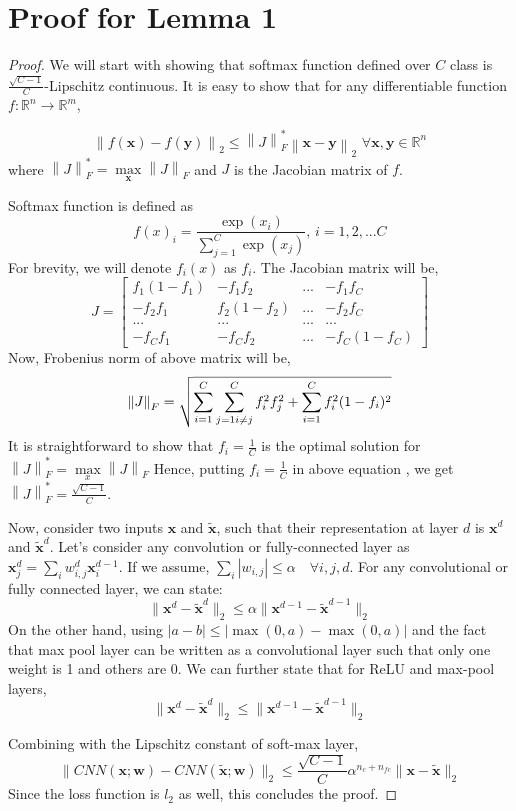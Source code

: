 
\section{Proof for Lemma 1}
\begin{proof}
We will start with showing that softmax function defined over $C$ class is $\frac{\sqrt{C-1}}{C}$-Lipschitz continuous. It is easy to show that for any differentiable function \mbox{$f:\mathbb{R}^n\rightarrow\mathbb{R}^m$},

\[
\left \| f(\mathbf{x})-f(\mathbf{y})\right \|_2 \leq \left \|J\right \|^*_F  \left\| \mathbf{x}-\mathbf{y}\right\|_2  \, \, \forall \mathbf{x},\mathbf{y}\in\mathbb{R}^n
\]
where $\left \|J\right \|^*_F = \max\limits_{\mathbf{x}} \left \|J\right \|_F$ and $J$ is the Jacobian matrix of $f$.

Softmax function is defined as
\[
f(x)_i = \frac{\exp(x_i)}{\sum\limits_{j=1}^{C}\exp(x_j)}, \, i={1,2,...C}
\]
For brevity, we will denote $f_i(x)$ as $f_i$. The Jacobian matrix will be,
\[
J = \begin{bmatrix} f_1(1-f_1) & -f_1f_2  & ... & -f_1f_C \\
-f_2f_1 & f_2(1-f_2)  & ...  & -f_2f_C \\
... & ... & ... & ...  \\
-f_{C}f_{1} & -f_{C}f_{2}  & ...  & -f_{C}(1-f_{C})
\end{bmatrix}
\]
Now, Frobenius norm of above matrix will be,
\[
\left \| J \right \|_F = \sqrt{\sum\limits_{i=1}^{C}\sum\limits_{j=1 \\ i\neq j}^{C}f_{i}^{2}f_{j}^{2} + \sum\limits_{i=1}^{C} f_i^2(1-f_i)^2}
\]
It is straightforward to show that $f_i = \frac{1}{C}$ is the optimal solution for $\left \| J \right \|^{*}_F = \max\limits_{x}\left \| J \right \|_F $ Hence, putting $f_i = \frac{1}{C}$ in above equation , we get \mbox{$\left \| J \right \|^{*}_F = \frac{\sqrt{C-1}}{C}$}.

Now, consider two inputs $\mathbf{x}$ and $\mathbf{\tilde{x}}$, such that their representation at layer $d$ is $\mathbf{x}^d$ and $\mathbf{\tilde{x}}^d$. Let's consider any convolution or fully-connected layer as $\mathbf{x}^d_j = \sum_i w_{i,j}^d \mathbf{x}^{d-1}_i$. If we assume, \mbox{$\sum_i |w_{i,j}| \leq \alpha \quad \forall i,j,d$}.  For any convolutional or fully connected layer, we can state:
\[
\|\mathbf{x}^d - \mathbf{\tilde{x}}^d\|_2 \leq  \alpha \|\mathbf{x}^{d-1} - \mathbf{\tilde{x}}^{d-1}\|_2
\] 
On the other hand, using $|a-b| \leq |\max(0, a) - \max(0,a)|$ and the fact that max pool layer can be written as a convolutional layer such that only one weight is 1 and others are 0. We can further state that for ReLU and max-pool layers,
\[
\|\mathbf{x}^d - \mathbf{\tilde{x}}^d\|_2 \leq  \|\mathbf{x}^{d-1} - \mathbf{\tilde{x}}^{d-1}\|_2
\] 

Combining with the Lipschitz constant of soft-max layer,
\[
\|CNN(\mathbf{x};\mathbf{w}) - CNN(\mathbf{\tilde{x}};\mathbf{w})\|_2 \leq   \frac{\sqrt{C-1}}{C} \alpha^{n_c+n_{fc}}  \|\mathbf{x}-\mathbf{\tilde{x}}\|_2
\]
Since the loss function is $l_2$ as well, this concludes the proof.
\end{proof}

